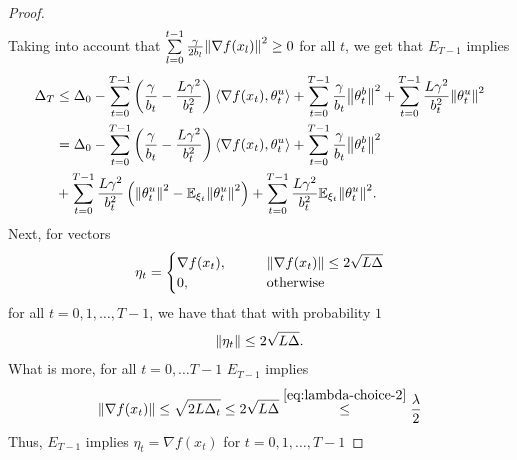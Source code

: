 \documentclass{article}
\begin{document}
\begin{proof}
\begin{align*}
    \end{align*}
    Taking into account that $\sum\limits_{l=0}^{t-1}\frac{\gamma}{2b_l}{\left\lVert\nabla f(x_l)\right\rVert}^2 \geq 0$ for all $t$, we get that $E_{T-1}$ implies
    \begin{align*}
        \Delta_T &\leq \Delta_0 - \sum\limits_{t=0}^{T-1}\left(\frac{\gamma}{b_t} - \frac{L\gamma^2}{b_t^2}\right)\left \langle \nabla f(x_t), \theta_t^u \right \rangle + \sum\limits_{t=0}^{T-1} \frac{\gamma}{b_t}{\left\lVert\theta_t^b\right\rVert}^2 + \sum\limits_{t=0}^{T-1}\frac{L\gamma^2}{b_t^2}{\left\lVert\theta_t^u\right\rVert}^2 \nonumber \\
        &= \Delta_0 - \sum\limits_{t=0}^{T-1}\left(\frac{\gamma}{b_t} - \frac{L\gamma^2}{b_t^2}\right)\left \langle \nabla f(x_t), \theta_t^u \right \rangle + \sum\limits_{t=0}^{T-1} \frac{\gamma}{b_t}{\left\lVert\theta_t^b\right\rVert}^2 \notag\\ 
        &+ \sum\limits_{t=0}^{T-1}\frac{L\gamma^2}{b_t^2}\left({\left\lVert\theta_t^u\right\rVert}^2 - {\mathbb E}_{\xi_t}{\left\lVert\theta_t^u\right\rVert}^2\right) + \sum\limits_{t=0}^{T-1}\frac{L\gamma^2}{b_t^2} {\mathbb E}_{\xi_t}{\left\lVert\theta_t^u\right\rVert}^2.
    \end{align*}
    Next, for vectors
    \begin{align*}
        \eta_t = \begin{cases}
            \nabla f(x_t), \qquad &\left\lVert\nabla f(x_t)\right\rVert \leq 2\sqrt{L\Delta}\\
            0, \qquad &\text{otherwise}
        \end{cases}
    \end{align*}
    for all $t = 0, 1, \ldots, T-1$, we have that that with probability $1$
    \begin{align}
        \left\lVert\eta_t\right\rVert \leq 2\sqrt{L\Delta}. \label{eq:eta-bound-2}
    \end{align}
    What is more, for all $t = 0, \ldots T-1$ $E_{T-1}$ implies
    \begin{align*}
        \left\lVert\nabla f(x_t)\right\rVert \leq \sqrt{2L\Delta_t} \leq 2\sqrt{L\Delta} \overset{\eqref{eq:lambda-choice-2}}{\leq} \frac{\lambda}{2}
    \end{align*}
    Thus, $E_{T-1}$ implies $\eta_t = \nabla f(x_t)$ for $t = 0, 1, \ldots, T-1$ 


\end{proof}
\end{document}
